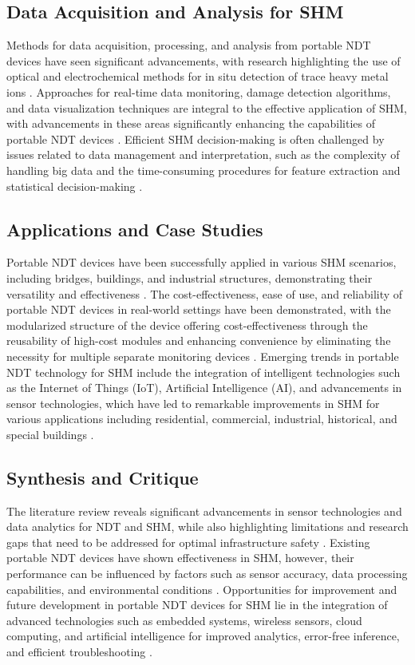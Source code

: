 \documentclass[journal, a4paper]{IEEEtran}
\begin{document}
\subsection{Data Acquisition and Analysis for SHM}
Methods for data acquisition, processing, and analysis from portable NDT
devices have seen significant advancements, with research highlighting the use of optical
and electrochemical methods for in situ detection of trace heavy metal ions \cite{Hu2023}.
Approaches for real-time data monitoring, damage detection algorithms, and data visualization techniques
are integral to the effective application of SHM, with advancements in these areas
significantly enhancing the capabilities of portable NDT devices \cite{Azimi2020} \cite{Lingxin2022}.
Efficient SHM decision-making is often challenged by issues related
to data management and interpretation, such as the complexity of handling big data and the time-consuming procedures
for feature extraction and statistical decision-making \cite{Entezami2020}.


\subsection{Applications and Case Studies}
Portable NDT devices have been successfully applied in various SHM
scenarios, including bridges, buildings, and industrial structures, demonstrating their versatility and effectiveness \cite{Parsy2018} \cite{Azimi2020}.
The cost-effectiveness, ease of use, and reliability of portable NDT
devices in real-world settings have been demonstrated, with the modularized structure of the device offering
cost-effectiveness through the reusability of high-cost modules and enhancing convenience by eliminating the
necessity for multiple separate monitoring devices \cite{Lee2023}.
Emerging trends in portable NDT technology for SHM
include the integration of intelligent technologies such as the Internet of Things (IoT), Artificial Intelligence (AI),
and advancements in sensor technologies, which have led to remarkable improvements in SHM for various applications
including residential, commercial, industrial, historical, and special buildings \cite{Vijayan2023} \cite{Hassani2023}. 


\subsection{Synthesis and Critique}
The literature review reveals significant advancements in sensor technologies and data analytics
for NDT and SHM,
while also highlighting limitations and research gaps that need to be addressed for optimal infrastructure safety \cite{Vijayan2023} \cite{Hassani2023}.
Existing portable NDT devices have shown effectiveness in SHM,
however, their performance can be influenced by factors such as sensor accuracy, data processing capabilities,
and environmental conditions \cite{Vijayan2023} \cite{Hassani2023}.
Opportunities for improvement and future development in portable NDT devices
for SHM lie in the integration of advanced technologies such as embedded systems,
wireless sensors, cloud computing, and artificial intelligence for improved analytics, error-free inference,
and efficient troubleshooting \cite{Meier2018}.
\end{document}
